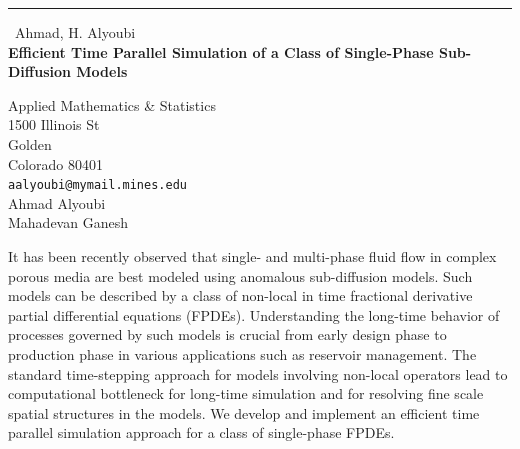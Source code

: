 \documentclass{report}
\begin{document}
\begin{center}
\rule{6in}{1pt} \
{\large Ahmad, H. Alyoubi \\
{\bf Efficient Time Parallel Simulation of a Class of Single-Phase Sub-Diffusion Models}}

Applied Mathematics \& Statistics \\ 1500 Illinois St \\ Golden \\ Colorado 80401
\\
{\tt aalyoubi@mymail.mines.edu}\\
Ahmad Alyoubi\\
Mahadevan Ganesh\end{center}

It has been recently observed that single- and multi-phase fluid flow in
complex porous media are best modeled using anomalous sub-diffusion
models. Such models can be described by a class of non-local in time
fractional derivative partial differential equations (FPDEs).
Understanding the long-time behavior of processes governed by such models
is crucial from early design phase to production phase in various
applications such as reservoir management. The standard time-stepping
approach for models involving non-local operators lead to computational
bottleneck for long-time simulation and for resolving fine scale spatial
structures in the models. We develop and implement an efficient time
parallel simulation approach for a class of single-phase FPDEs.
\end{document}
